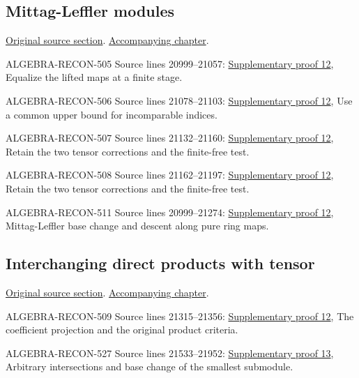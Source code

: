 \subsection{Mittag-Leffler modules}
\hypertarget{algebra-source-section-mittag-leffler-modules}{}
\noindent\href{https://github.com/stacks/stacks-project/blob/a04446e57ec1fbc252a871afcec7752fb2807b14/algebra.tex\#L20881}{Original source section}. \href{algebra.pdf\#nameddest=section-mittag-leffler-modules}{Accompanying chapter}.

\begin{AlgebraSourceRoutes}
\item[ALGEBRA-RECON-505] Source lines 20999--21057: \hyperlink{algebra_ml_review_notes_20260927}{Supplementary proof 12}, Equalize the lifted maps at a finite stage.
\item[ALGEBRA-RECON-506] Source lines 21078--21103: \hyperlink{algebra_ml_review_notes_20260927}{Supplementary proof 12}, Use a common upper bound for incomparable indices.
\item[ALGEBRA-RECON-507] Source lines 21132--21160: \hyperlink{algebra_ml_review_notes_20260927}{Supplementary proof 12}, Retain the two tensor corrections and the finite-free test.
\item[ALGEBRA-RECON-508] Source lines 21162--21197: \hyperlink{algebra_ml_review_notes_20260927}{Supplementary proof 12}, Retain the two tensor corrections and the finite-free test.
\item[ALGEBRA-RECON-511] Source lines 20999--21274: \hyperlink{algebra_ml_review_notes_20260927}{Supplementary proof 12}, Mittag-Leffler base change and descent along pure ring maps.
\end{AlgebraSourceRoutes}

\subsection{Interchanging direct products with tensor}
\hypertarget{algebra-source-section-products-tensor}{}
\noindent\href{https://github.com/stacks/stacks-project/blob/a04446e57ec1fbc252a871afcec7752fb2807b14/algebra.tex\#L21277}{Original source section}. \href{algebra.pdf\#nameddest=section-products-tensor}{Accompanying chapter}.

\begin{AlgebraSourceRoutes}
\item[ALGEBRA-RECON-509] Source lines 21315--21356: \hyperlink{algebra_ml_review_notes_20260927}{Supplementary proof 12}, The coefficient projection and the original product criteria.
\item[ALGEBRA-RECON-527] Source lines 21533--21952: \hyperlink{algebra_ml_coherent_notes_20260927}{Supplementary proof 13}, Arbitrary intersections and base change of the smallest submodule.
\end{AlgebraSourceRoutes}

